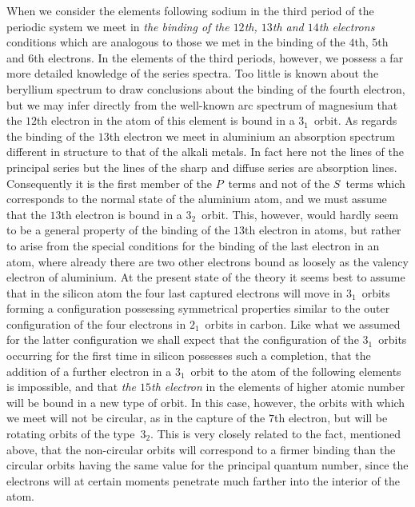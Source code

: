 When we consider the elements following sodium in the third
period of the periodic system we meet in \emph{the binding of the $12$th,
$13$th and $14$th electrons} conditions which are analogous to those
we met in the binding of the $4$th, $5$th and $6$th electrons. In the
elements of the third periods, however, we possess a far more
detailed knowledge of the series spectra. Too little is known
about the beryllium spectrum to draw conclusions about the
binding of the fourth electron, but we may infer directly from the
well-known arc spectrum of magnesium that the $12$th electron
in the atom of this element is bound in a $3_{1}$~orbit. As regards
the binding of the $13$th electron we meet in aluminium an
absorption spectrum different in structure to that of the alkali
metals. In fact here not the lines of the principal series but the
lines of the sharp and diffuse series are absorption lines. Consequently
it is the first member of the $P$~terms and not of the $S$~terms
which corresponds to the normal state of the aluminium
atom, and we must assume that the $13$th electron is bound in
a $3_{2}$~orbit. This, however, would hardly seem to be a general
property of the binding of the $13$th electron in atoms, but rather
to arise from the special conditions for the binding of the last
electron in an atom, where already there are two other electrons
bound as loosely as the valency electron of aluminium. At the
present state of the theory it seems best to assume that in the
silicon atom the four last captured electrons will move in $3_{1}$~orbits
forming a configuration possessing symmetrical properties
similar to the outer configuration of the four electrons in $2_{1}$~orbits
in carbon. Like what we assumed for the latter configuration we
shall expect that the configuration of the $3_{1}$~orbits occurring for the
first time in silicon possesses such a completion, that the addition
of a further electron in a $3_{1}$~orbit to the atom of the following elements
is impossible, and that \emph{the $15$th electron} in the elements of
higher atomic number will be bound in a new type of orbit. In this
case, however, the orbits with which we meet will not be circular,
as in the capture of the $7$th electron, but will be rotating 
orbits of the type~$3_{2}$. This is very closely related to the fact, mentioned
above, that the non-circular orbits will correspond to a
firmer binding than the circular orbits having the same value for
the principal quantum number, since the electrons will at certain
moments penetrate much farther into the interior of the atom.
